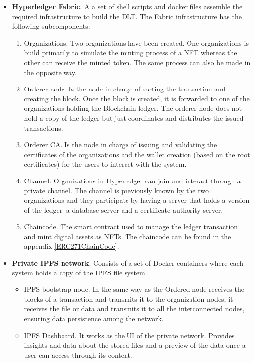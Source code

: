 \begin{itemize}
    \item \textbf{Hyperledger Fabric}. A a set of shell scripts and docker files assemble the required infrastructure to build the  \ac{DLT}. The Fabric infrastructure has the following subcomponents: 
    \begin{enumerate}
        \item Organizations. Two organizations have been created. One organizations is build primarily to simulate the minting process of a \ac{NFT} whereas the other can receive the minted token. The same process can also be made in the opposite way.
        \item Orderer node. Is the node in charge of sorting the transaction and creating the block. Once the block is created, it is forwarded to one of the organizations holding the Blockchain ledger. The orderer node does not hold a copy of the ledger but just coordinates and distributes the issued transactions.
        \item Orderer \ac{CA}. Is the node in charge of issuing and validating the certificates of the organizations and the wallet creation (based on the root certificates) for the users to interact with the system.
        \item Channel. Organizations in Hyperledger can join and interact through a private channel. The channel is previously known by the two organizations and they participate by having a server that holds a version of the ledger, a database server and a certificate authority server.
        \item Chaincode. The smart contract used to manage the ledger transaction and mint digital assets as \ac{NFT}s. The chaincode can be found in the appendix \ref{ERC271ChainCode}.
    \end{enumerate}
    \item \textbf{Private \ac{IPFS} network}. Consists of a set of Docker containers where each system holds a copy of the \ac{IPFS} file system.
    \begin{itemize}
        \item \ac{IPFS} bootstrap node. In the same way as the Ordered node receives the blocks of a transaction and transmits it to the organization nodes, it receives the file or data and transmits it to all the interconnected nodes, ensuring data persistence among the network.
        \item \ac{IPFS} Dashboard. It works as the \ac{UI} of the private network. Provides insights and data about the stored files and a preview of the data once a user can access through its content.

\end{itemize}
\end{itemize}
